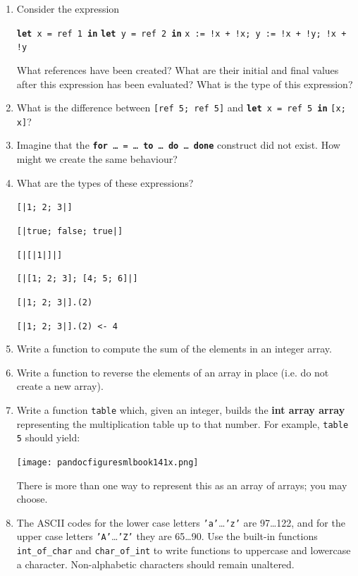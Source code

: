\documentclass[]{book}
\begin{document}
\begin{enumerate}
  \item Consider the expression
  
    \textbf{\texttt{let}}\texttt{ x = ref 1 }\textbf{\texttt{in}} \textbf{\texttt{let}}\texttt{ y = ref 2 }\textbf{\texttt{in}} \texttt{x := !x + !x; y := !x + !y; !x + !y}
  
  What references have been created? What are their initial and final values after this expression has been evaluated? What is the type of this expression? 

\item What is the difference between \texttt{[ref 5; ref 5]} and \textbf{\texttt{let}}\texttt{ x = ref 5 }\textbf{\texttt{in}} \texttt{[x; x]}? 
    
  \item Imagine that the \textbf{\texttt{for}}\texttt{ \ldots\ = \ldots\ }\textbf{\texttt{to}}\texttt{ \ldots\ }\textbf{\texttt{do}}\texttt{ \ldots\ }\textbf{\texttt{done}}  construct did not exist. How might we create the same behaviour?
  
  \item What are the types of these expressions?
  
  \texttt{[|1; 2; 3|]}
  
  \texttt{[|true; false; true|]}
  
  \texttt{[|[|1|]|]}
  
  \texttt{[|[1; 2; 3]; [4; 5; 6]|]}
  
  \texttt{[|1; 2; 3|].(2)}
  
  \texttt{[|1; 2; 3|].(2) <- 4}
  
  \item Write a function to compute the sum of the elements in an integer array.
  
  \item Write a function to reverse the elements of an array in place (i.e. do not create a new array).
  
  \item Write a function \texttt{table} which, given an integer, builds the \textbf{\textsf{int array array}} representing the multiplication table up to that number. For example, \texttt{table 5} should yield:

\medskip
\begin{center}
\noindent\texttt{[image: pandocfiguresmlbook141x.png]}
\end{center}
\medskip

  There is more than one way to represent this as an array of arrays; you may choose.
  \item The ASCII codes for the lower case letters \texttt{'a'}\ldots\texttt{'z'} are 97\ldots 122, and for the upper case letters \texttt{'A'}\ldots\texttt{'Z'} they are 65\ldots 90. Use the built-in functions \texttt{int\_of\_char} and \texttt{char\_of\_int} to write functions to uppercase and lowercase a character. Non-alphabetic characters should remain unaltered.
  

\end{enumerate}
\end{document}
